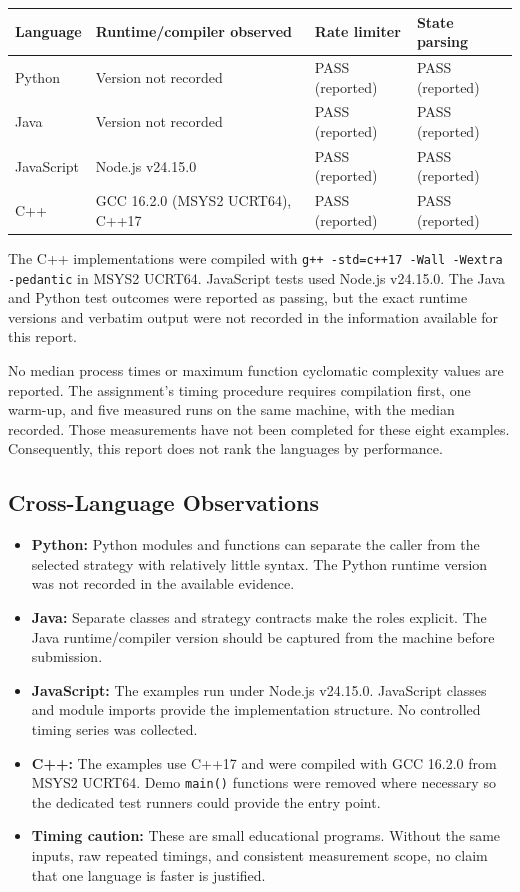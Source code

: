 \documentclass[11pt,a4paper]{article}
\newcommand{\code}[1]{\texttt{#1}}
\begin{document}
\begin{center}
\small
\begin{tabularx}{\linewidth}{@{}lXll@{}}
\toprule
Language & Runtime/compiler observed & Rate limiter & State parsing\\
\midrule
Python & Version not recorded & PASS (reported) & PASS (reported)\\
Java & Version not recorded & PASS (reported) & PASS (reported)\\
JavaScript & Node.js v24.15.0 & PASS (reported) & PASS (reported)\\
C++ & GCC 16.2.0 (MSYS2 UCRT64), C++17 & PASS (reported) & PASS (reported)\\
\bottomrule
\end{tabularx}
\end{center}

The C++ implementations were compiled with \code{g++ -std=c++17 -Wall -Wextra -pedantic} in MSYS2 UCRT64. JavaScript tests used Node.js v24.15.0. The Java and Python test outcomes were reported as passing, but the exact runtime versions and verbatim output were not recorded in the information available for this report.

No median process times or maximum function cyclomatic complexity values are reported. The assignment's timing procedure requires compilation first, one warm-up, and five measured runs on the same machine, with the median recorded. Those measurements have not been completed for these eight examples. Consequently, this report does not rank the languages by performance.

\subsection{Cross-Language Observations}
\begin{itemize}[leftmargin=*]
\item \textbf{Python:} Python modules and functions can separate the caller from the selected strategy with relatively little syntax. The Python runtime version was not recorded in the available evidence.
\item \textbf{Java:} Separate classes and strategy contracts make the roles explicit. The Java runtime/compiler version should be captured from the machine before submission.
\item \textbf{JavaScript:} The examples run under Node.js v24.15.0. JavaScript classes and module imports provide the implementation structure. No controlled timing series was collected.
\item \textbf{C++:} The examples use C++17 and were compiled with GCC 16.2.0 from MSYS2 UCRT64. Demo \code{main()} functions were removed where necessary so the dedicated test runners could provide the entry point.
\item \textbf{Timing caution:} These are small educational programs. Without the same inputs, raw repeated timings, and consistent measurement scope, no claim that one language is faster is justified.
\end{itemize}
\end{document}
